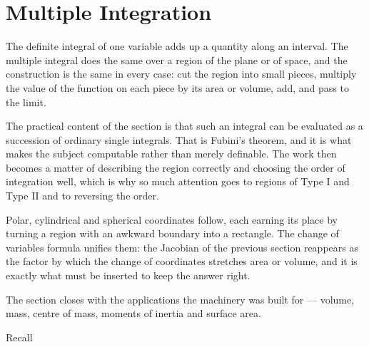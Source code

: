 \documentclass[11pt,a4paper]{article}
\theoremstyle{definition}
\begin{document}
\section{Multiple Integration}

The definite integral of one variable adds up a quantity along an interval. The
multiple integral does the same over a region of the plane or of space, and the
construction is the same in every case: cut the region into small pieces,
multiply the value of the function on each piece by its area or volume, add, and
pass to the limit.

The practical content of the section is that such an integral can be evaluated
as a succession of ordinary single integrals. That is Fubini's theorem, and it
is what makes the subject computable rather than merely definable. The work then
becomes a matter of describing the region correctly and choosing the order of
integration well, which is why so much attention goes to regions of Type I and
Type II and to reversing the order.

Polar, cylindrical and spherical coordinates follow, each earning its place by
turning a region with an awkward boundary into a rectangle. The change of
variables formula unifies them: the Jacobian of the previous section reappears
as the factor by which the change of coordinates stretches area or volume, and
it is exactly what must be inserted to keep the answer right.

The section closes with the applications the machinery was built for --- volume,
mass, centre of mass, moments of inertia and surface area.


Recall


\begin{figure}[H]
\centering
{}
\end{figure}
\end{document}
